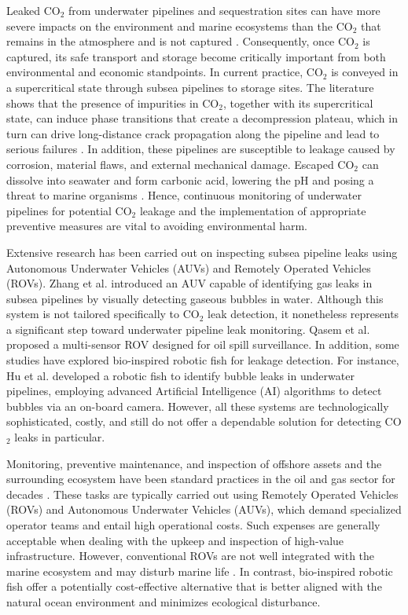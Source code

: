 \documentclass[12pt, draftclsnofoot, onecolumn]{IEEEtran}
\begin{document}
Leaked CO$_2$ from underwater pipelines and sequestration sites can have more severe impacts on the environment and marine ecosystems than the CO$_2$ that remains in the atmosphere and is not captured \cite{Zheng2021,Mortezaei2021}. Consequently, once CO$_2$ is captured, its safe transport and storage become critically important from both environmental and economic standpoints. In current practice, CO$_2$ is conveyed in a supercritical state through subsea pipelines to storage sites. The literature shows that the presence of impurities in CO$_2$, together with its supercritical state, can induce phase transitions that create a decompression plateau, which in turn can drive long-distance crack propagation along the pipeline and lead to serious failures \cite{Aursand2016,CoshamAtkinsBoreas2009}. In addition, these pipelines are susceptible to leakage caused by corrosion, material flaws, and external mechanical damage. Escaped CO$_2$ can dissolve into seawater and form carbonic acid, lowering the pH and posing a threat to marine organisms \cite{queiros2014potential,Pham2016}. Hence, continuous monitoring of underwater pipelines for potential CO$_2$ leakage and the implementation of appropriate preventive measures are vital to avoiding environmental harm.

Extensive research has been carried out on inspecting subsea pipeline leaks using Autonomous Underwater Vehicles (AUVs) and Remotely Operated Vehicles (ROVs). Zhang et al. \cite{Zhang2021} introduced an AUV capable of identifying gas leaks in subsea pipelines by visually detecting gaseous bubbles in water. Although this system is not tailored specifically to CO$_2$ leak detection, it nonetheless represents a significant step toward underwater pipeline leak monitoring. Qasem et al. \cite{Qasem2019} proposed a multi-sensor ROV designed for oil spill surveillance. In addition, some studies have explored bio-inspired robotic fish for leakage detection. For instance, Hu et al. \cite{Hu2022} developed a robotic fish to identify bubble leaks in underwater pipelines, employing advanced Artificial Intelligence (AI) algorithms to detect bubbles via an on-board camera. However, all these systems are technologically sophisticated, costly, and still do not offer a dependable solution for detecting CO$_2$ leaks in particular.

Monitoring, preventive maintenance, and inspection of offshore assets and the surrounding ecosystem have been standard practices in the oil and gas sector for decades \cite{Shukla2016,Mcleod2012,Patel2024}. These tasks are typically carried out using Remotely Operated Vehicles (ROVs) and Autonomous Underwater Vehicles (AUVs), which demand specialized operator teams and entail high operational costs. Such expenses are generally acceptable when dealing with the upkeep and inspection of high-value infrastructure. However, conventional ROVs are not well integrated with the marine ecosystem and may disturb marine life \cite{Polverino2013,Marras2012}. In contrast, bio-inspired robotic fish offer a potentially cost-effective alternative that is better aligned with the natural ocean environment and minimizes ecological disturbance.
\end{document}
